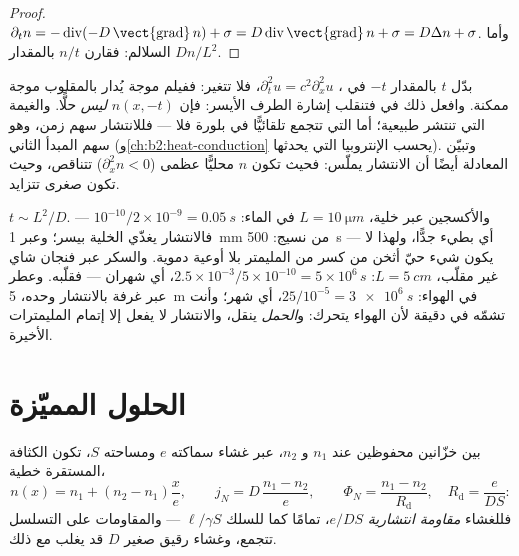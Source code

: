 \begin{proof}
$\partial_t n = -\operatorname{div}(-D\,\vect{\operatorname{grad}}\,n) +
\sigma = D\operatorname{div}\vect{\operatorname{grad}}\,n + \sigma = D\Delta
n + \sigma$. وأما السلالم: فقارن $n/t$ بالمقدار $Dn/L^2$.
\end{proof}

\begin{remark}\label{rem:b2:particle-diffusion:irreversible}
بدّل $t$ بالمقدار $-t$ في ، $\partial_t^2 u = c^2
\partial_x^2 u$، فلا تتغير: ففيلم موجة يُدار بالمقلوب
موجة ممكنة. وافعل ذلك في  فتنقلب إشارة
الطرف الأيسر: فإن $n(x,-t)$ \emph{ليس} حلًّا. والغيمة التي
تنتشر طبيعية؛ أما التي تتجمع تلقائيًّا في بلورة
فلا --- فللانتشار سهم زمن، وهو سهم المبدأ الثاني
(و\cref{ch:b2:heat-conduction} يحسب الإنتروبيا التي يحدثها). وتبيّن
المعادلة أيضًا أن الانتشار يملّس: فحيث تكون $n$ محليًّا
عظمى ($\partial_x^2 n < 0$) تتناقص، وحيث تكون صغرى
تتزايد.
\end{remark}

\begin{example}\label{ex:b2:particle-diffusion:times}
$t \sim L^2/D$. والأكسجين عبر خلية، $L = \qty{10}{\micro m}$ في الماء:
$10^{-10}/2 \times 10^{-9} = \qty{0.05}{s}$ --- فالانتشار يغذّي الخلية
بيسر؛ وعبر \qty{1}{mm} من نسيج: \qty{500}{s} --- أي بطيء جدًّا، ولهذا
لا يكون شيء حيّ أثخن من كسر من المليمتر بلا أوعية دموية. والسكر عبر
فنجان شاي غير مقلّب، $L = \qty{5}{cm}$:
$2.5 \times 10^{-3}/5 \times 10^{-10} = 5 \times 10^6\,\unit{s}$، أي شهران
--- فقلّبه. وعطر عبر غرفة بالانتشار وحده، \qty{5}{m} في
الهواء: $25/10^{-5} = \qty{3e6}{s}$، أي شهر؛ وأنت تشمّه في دقيقة
لأن الهواء يتحرك: و\emph{الحمل} ينقل، والانتشار لا يفعل إلا
إتمام المليمترات الأخيرة.
\end{example}

\section{الحلول المميّزة}

\begin{proposition}\label{prop:b2:particle-diffusion:membrane}
بين خزّانين محفوظين عند $n_1$ و $n_2$، عبر غشاء
سماكته $e$ ومساحته $S$، تكون الكثافة المستقرة خطية،
\[
n(x) = n_1 + (n_2 - n_1)\frac{x}{e}, \qquad
j_N = D\,\frac{n_1 - n_2}{e}, \qquad
\Phi_N = \frac{n_1 - n_2}{R_{\text{d}}}, \quad R_{\text{d}} = \frac{e}{DS}:
\]
فللغشاء \emph{مقاومة انتشارية} $e/DS$، تمامًا كما للسلك
$\ell/\gamma S$ --- والمقاومات على التسلسل تتجمع، وغشاء رقيق
صغير $D$ قد يغلب مع ذلك.
\end{proposition}

